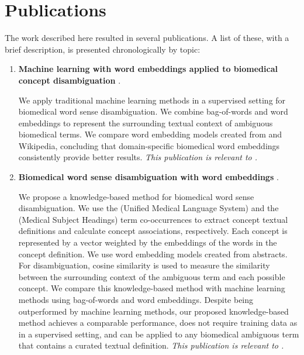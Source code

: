 \section{Publications}

The work described here resulted in several publications.
A list of these, with a brief description, is presented chronologically by topic:

\begin{enumerate}[topsep=12pt,itemsep=12pt]

\item
\textbf{Machine learning with word embeddings applied to biomedical concept disambiguation} \parencite{antunes2016a}.\par
We apply traditional machine learning methods in a supervised setting for biomedical word sense disambiguation.
We combine bag-of-words and word embeddings to represent the surrounding textual context of ambiguous biomedical terms.
We compare word embedding models created from  and Wikipedia, concluding that domain-specific biomedical word embeddings consistently provide better results.
\newline\textit{This publication is relevant to .}

\item
\textbf{Biomedical word sense disambiguation with word embeddings} \parencite{antunes2017a}.\par
We propose a knowledge-based method for biomedical word sense disambiguation.
We use the  (Unified Medical Language System) and the  (Medical Subject Headings) term co-occurrences to extract concept textual definitions and calculate concept associations, respectively.
Each concept is represented by a vector weighted by the embeddings of the words in the concept definition.
We use word embedding models created from  abstracts.
For disambiguation, cosine similarity is used to measure the similarity between the surrounding context of the ambiguous term and each possible concept.
We compare this knowledge-based method with machine learning methods using bag-of-words and word embeddings.
Despite being outperformed by machine learning methods, our proposed knowledge-based method achieves a comparable performance, does not require training data as in a supervised setting, and can be applied to any biomedical ambiguous term that contains a curated textual definition.
\newline\textit{This publication is relevant to .}


\end{enumerate}
